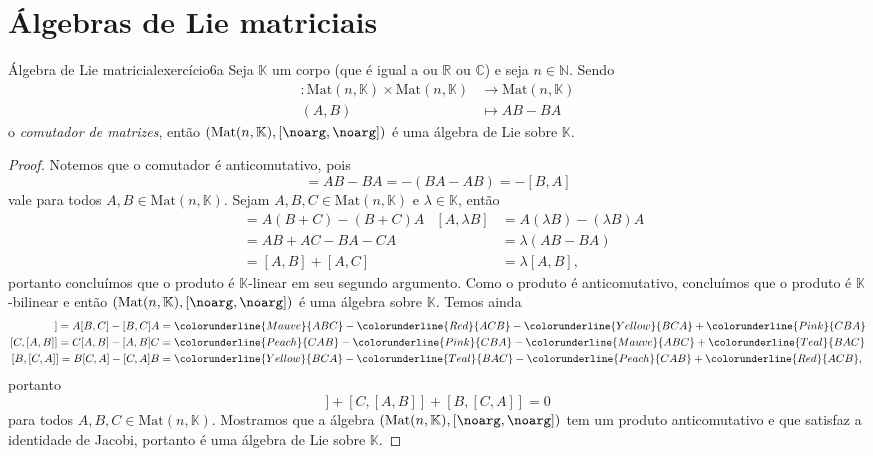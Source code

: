 \section{Álgebras de Lie matriciais}
\begin{proposition}{Álgebra de Lie matricial}{exercício6a}
    Seja \(\mathbb{K}\) um corpo (que é igual a ou \(\mathbb{R}\) ou \(\mathbb{C}\)) e seja \(n \in \mathbb{N}\). Sendo
    \begin{align*}
        [\noarg,\noarg] : \mathrm{Mat}(n, \mathbb{K}) \times \mathrm{Mat}(n, \mathbb{K}) &\to \mathrm{Mat}(n, \mathbb{K})\\
                                                                                   (A,B) &\mapsto AB - BA
    \end{align*}
    o \emph{comutador de matrizes}, então \((\mathrm{Mat}(n, \mathbb{K}), [\noarg, \noarg])\) é uma álgebra de Lie sobre \(\mathbb{K}\).
\end{proposition}
\begin{proof}
    Notemos que o comutador é anticomutativo, pois
    \begin{equation*}
        [A, B] = AB - BA = - (BA - AB) = -[B,A]
    \end{equation*}
    vale para todos \(A, B \in \mathrm{Mat}(n, \mathbb{K})\). Sejam \(A, B, C \in \mathrm{Mat}(n, \mathbb{K})\) e \(\lambda \in \mathbb{K}\), então
    \begin{align*}
        [A, B + C] &= A(B+C) - (B+C)A&
        [A, \lambda B] &= A(\lambda B) - (\lambda B)A\\
                      &= AB + AC - BA - CA&
                      &= \lambda \left(AB - BA\right)\\
                      &= [A, B] + [A, C]&
                      &= \lambda [A,B],
    \end{align*}
    portanto concluímos que o produto é \(\mathbb{K}\)-linear em seu segundo argumento. Como o produto é anticomutativo, concluímos que o produto é \(\mathbb{K}\)-bilinear e então \((\mathrm{Mat}(n, \mathbb{K}), [\noarg, \noarg])\) é uma álgebra sobre \(\mathbb{K}\). Temos ainda
    \begin{align*}
        [A, [B, C]] = A[B, C] - [B,C]A &= \colorunderline{Mauve}{ABC} - \colorunderline{Red}{ACB} - \colorunderline{Yellow}{BCA} + \colorunderline{Pink}{CBA}\\
        [C, [A, B]] = C[A, B] - [A,B]C &= \colorunderline{Peach}{CAB} - \colorunderline{Pink}{CBA} - \colorunderline{Mauve}{ABC} + \colorunderline{Teal}{BAC}\\
        [B, [C, A]] = B[C, A] - [C,A]B &= \colorunderline{Yellow}{BCA} - \colorunderline{Teal}{BAC} - \colorunderline{Peach}{CAB} + \colorunderline{Red}{ACB},
    \end{align*}
    portanto
    \begin{equation*}
        [A,[B,C]] + [C,[A,B]] + [B, [C,A]] = 0
    \end{equation*}
    para todos \(A,B, C \in \mathrm{Mat}(n, \mathbb{K})\). Mostramos que a álgebra \((\mathrm{Mat}(n, \mathbb{K}), [\noarg, \noarg])\) tem um produto anticomutativo e que satisfaz a identidade de Jacobi, portanto é uma álgebra de Lie sobre \(\mathbb{K}\).
\end{proof}

